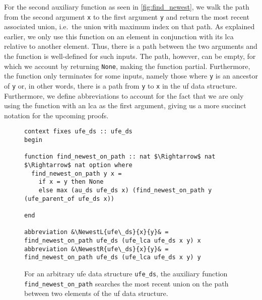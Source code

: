 \documentclass[
  sigplan,
  10pt,
  anonymous,
  review,
  ]{acmart}
\newcommand{\NewestL}[3]{(#2 $\upharpoonleft$ #3)$_\text{#1}$}
\newcommand{\NewestR}[3]{(#2 $\upharpoonright$ #3)$_\text{#1}$}
\begin{document}
For the second auxiliary function as seen in \autoref{fig:find_newest}, we walk the path from the second argument \lstinline|x| to the first argument \lstinline|y| and return the most recent associated union, i.e.\ the union with maximum index on that path.
As explained earlier, we only use this function on an element in conjunction with its \acrshort{lca} relative to another element.
Thus, there is a path between the two arguments and the function is well-defined for such inputs.
The path, however, can be empty, for which we account by returning \lstinline|None|, making the function partial.
Furthermore, the function only terminates for some inputs, namely those where \lstinline|y| is an ancestor of \lstinline|y| or, in other words, there is a path from \lstinline|y| to \lstinline|x| in the \acrshort{uf} data structure.
Furthermore, we define abbreviations to account for the fact that we are only using the function with an \acrshort{lca} as the first argument,
giving us a more succinct notation for the upcoming proofs.
\begin{figure*}
  \begin{lstlisting}
context fixes ufe_ds :: ufe_ds
begin

function find_newest_on_path :: nat $\Rightarrow$ nat $\Rightarrow$ nat option where
  find_newest_on_path y x =
    if x = y then None
    else max (au_ds ufe_ds x) (find_newest_on_path y (ufe_parent_of ufe_ds x))

end

abbreviation &\NewestL{ufe\_ds}{x}{y}& = find_newest_on_path ufe_ds (ufe_lca ufe_ds x y) x
abbreviation &\NewestR{ufe\_ds}{x}{y}& = find_newest_on_path ufe_ds (ufe_lca ufe_ds x y) y 
  \end{lstlisting}
  \caption{For an arbitrary \acrshort{ufe} data structure \lstinline|ufe_ds|, the auxiliary function \lstinline|find_newest_on_path| searches the most recent union on the path between two elements of the \acrshort{uf} data structure.
  \label{fig:find_newest}}
\end{figure*}
\end{document}
